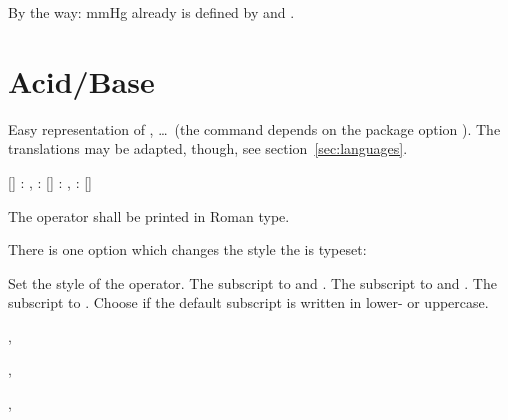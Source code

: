 \documentclass[load-preamble+]{cnltx-doc}
\begin{document}
By the way:  \si{\mmHg} already is defined by  and
.

\section{Acid/Base}\label{sec:saeure_base}

Easy representation of \pH, \pKa \ldots\ (the command  depends on the
package option ). The translations may be adapted, though,
see section~\ref{sec:languages}.
\begin{commands}
   \pH
   \pOH
   \Ka
   \Kb
   \Kw
  [] : \pKa, : \pKa[1]
  [] : \pKb, : \pKb[1]
  [] \eg\  \p{\Kw}
\end{commands}

\begin{example}
  \Ka \Kb \pKa \pKa[1] \pKb \pKb[1]
\end{example}

\begin{cnltxquote}
 The operator \p{} \textelp{} shall be printed in Roman type.
\end{cnltxquote}

There is one option which changes the style the \p{} is typeset:
\begin{options}
    Set the style of the \p{} operator.
    The subscript to  and .
    The subscript to  and .
    The subscript to .
    Choose if the default subscript is written in lower- or
    uppercase.
\end{options}
\begin{example}
  \pH, \pKa \par
   \pH, \pKa \par
   \pH, \pKa
\end{example}
\end{document}
